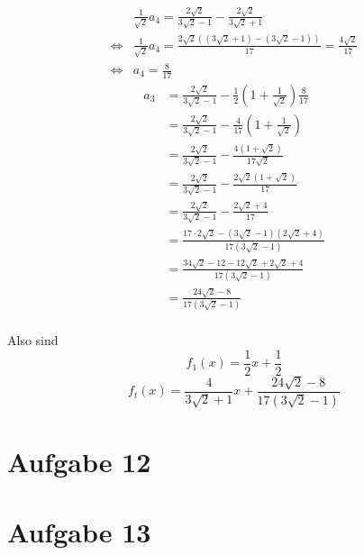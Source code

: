 \documentclass[10pt,a4paper]{article}
\begin{document}
\begin{align*}
  & \frac{1}{\sqrt{2}}a_{4} = \frac{2 \sqrt{2}}{3 \sqrt{2} - 1} - \frac{2 \sqrt{2}}{3 \sqrt{2} + 1}\\
  \Leftrightarrow & \frac{1}{\sqrt{2}}a_{4} = \frac{2 \sqrt{2}((3 \sqrt{2} + 1) - (3 \sqrt{2} - 1))}{17} = \frac{4 \sqrt{2}}{17}\\
  \Leftrightarrow & a_{4} = \frac{8}{17}
\end{align*}
\begin{align*}
  a_{3} & = \frac{2 \sqrt{2}}{3 \sqrt{2} - 1} - \frac{1}{2} \left( 1 + \frac{1}{\sqrt{2}} \right) \frac{8}{17}\\
  & = \frac{2 \sqrt{2}}{3 \sqrt{2} - 1} - \frac{4}{17} \left( 1 + \frac{1}{\sqrt{2}} \right)\\
  & = \frac{2 \sqrt{2}}{3 \sqrt{2} - 1} - \frac{4 (1 + \sqrt{2})}{17 \sqrt{2}}\\
  & = \frac{2 \sqrt{2}}{3 \sqrt{2} - 1} - \frac{2 \sqrt{2} (1 + \sqrt{2})}{17}\\
  & = \frac{2 \sqrt{2}}{3 \sqrt{2} - 1} - \frac{2 \sqrt{2} + 4}{17}\\
  & = \frac{17 \cdot 2 \sqrt{2} - (3 \sqrt{2} - 1)(2 \sqrt{2} + 4)}{17 (3 \sqrt{2} - 1)}\\
  & = \frac{34 \sqrt{2} - 12 - 12 \sqrt{2} + 2 \sqrt{2} + 4}{17 (3 \sqrt{2} - 1)}\\
  & = \frac{24 \sqrt{2} - 8}{17 (3 \sqrt{2} - 1)}\\
\end{align*}

Also sind
\begin{equation}
  f_{1}(x) = \frac{1}{2}x + \frac{1}{2}
\end{equation}
\begin{equation}
  f_{t}(x) = \frac{4}{3\sqrt{2} + 1}x + \frac{24 \sqrt{2} - 8}{17 (3 \sqrt{2} - 1)}
\end{equation}

\section{Aufgabe 12}

\section{Aufgabe 13}
\end{document}
